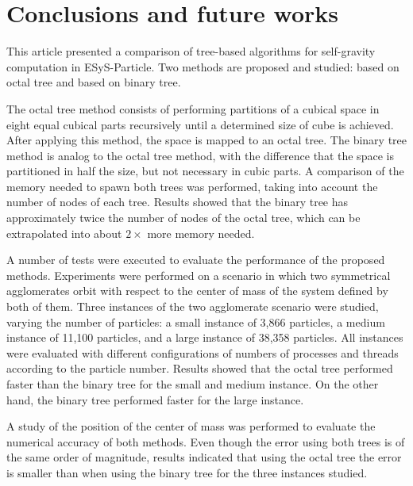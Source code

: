 \documentclass[runningheads]{llncs}
\begin{document}
 
\section{Conclusions and future works}
\label{sec:conclusion}

This article presented 
a comparison of tree-based algorithms
for self-gravity computation in ESyS-Particle. 
Two methods are proposed and studied: based on octal tree and based on binary tree.

The octal tree method consists of performing partitions of a cubical space in eight equal cubical parts recursively until a determined size of cube is achieved. After applying this method, the space is mapped to an octal tree. The binary tree method is analog to the octal tree method, with the difference that the space is partitioned in half the size, but not necessary in cubic parts. A comparison of the memory needed to spawn both trees was performed, taking into account the number of nodes of each tree. Results showed that the binary tree has approximately twice the number of nodes of the octal tree, which can be extrapolated into about $2 \times$ more memory needed. 

A number of tests were executed to evaluate the performance of %
the proposed methods.
Experiments were performed on a scenario in which two symmetrical agglomerates orbit with respect to the center of mass of the system defined by both of them. Three instances of the two agglomerate scenario were studied, varying the number of particles: a small instance of 3,866 particles, a medium instance of 11,100 particles, and a large instance of 38,358 particles. All instances were evaluated with different configurations of numbers of processes and threads according to the particle number. Results showed that the octal tree performed faster than the binary tree for the small and medium instance. On the other hand, the binary tree performed faster for the large instance. 

A study of the position of the center of mass was performed to evaluate the numerical accuracy of both methods. Even though the error using both trees is of the same order of magnitude, results indicated that using the octal tree the error is smaller than when using the binary tree for the three instances studied.
\end{document}
